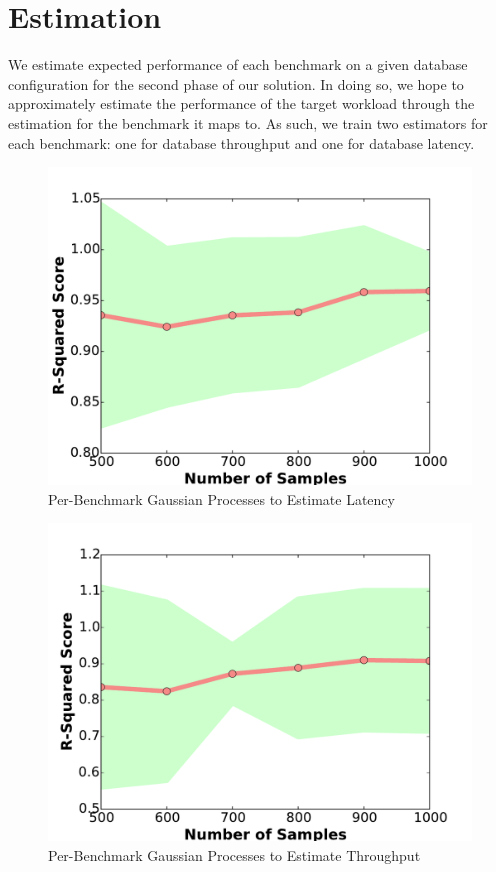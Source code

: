 \section{Estimation} \label{sec:estimation}

We estimate expected performance of each benchmark on a given database
configuration for the second phase of our solution. In doing so, we
hope to approximately estimate the performance of the target workload
through the estimation for the benchmark it maps to. As such, we train
two estimators for each benchmark: one for database throughput and one
for database latency.

\begin{figure}[h!]
    \centering
    \includegraphics[width=0.7\linewidth]{figure/gp_per_benchmark_r2_scores_latency_mutate.pdf}
    \caption{Per-Benchmark Gaussian Processes to Estimate Latency}
    \label{fig:gp_r2_latency}
\end{figure}

\begin{figure}[h!]
    \centering
    \includegraphics[width=0.7\linewidth]{figure/gp_per_benchmark_r2_scores_throughput_mutate.pdf}
    \caption{Per-Benchmark Gaussian Processes to Estimate Throughput}
    \label{fig:gp_r2_throughput}
\end{figure}


